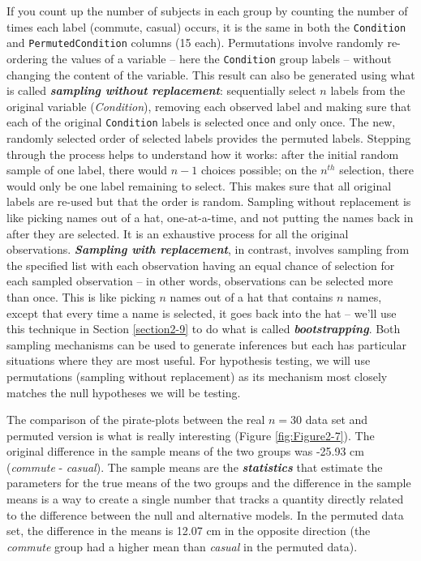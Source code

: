 \documentclass[
]{book}
\begin{document}
If you count up the number of subjects in each group by counting the number
of times each label (commute, casual) occurs, it is the same in both the
\texttt{Condition} and \texttt{PermutedCondition} columns (15 each). Permutations involve randomly
re-ordering the values of a variable -- here the \texttt{Condition} group labels -- without
changing the content of the variable.
This result can also be generated using
what is called \textbf{\emph{sampling without replacement}}:  sequentially select \(n\) labels
from the original variable (\emph{Condition}), removing each observed label and making sure that each of the
original \texttt{Condition} labels is selected once and only once. The new, randomly
selected order of selected labels provides the permuted labels. Stepping
through the process helps to understand how it works: after the initial random
sample of one label, there would \(n - 1\) choices possible; on the \(n^{th}\)
selection, there would only be one label remaining to select. This makes sure
that all original labels are re-used but that the order is random. Sampling
without replacement is like picking names out of a hat, one-at-a-time, and not
putting the names back in after they are selected. It is an exhaustive process
for all the original observations. \textbf{\emph{Sampling with replacement}},  in contrast,
involves sampling from the specified list with each observation having an equal
chance of selection for each sampled observation -- in other words, observations
can be selected more than once. This is like picking \(n\) names out of a hat that
contains \(n\) names, except that every time a name is selected, it goes back into
the hat -- we'll use this technique in Section \ref{section2-9}
to do what is called \textbf{\emph{bootstrapping}}.
Both sampling mechanisms can be
used to generate inferences but each has particular situations
where they are most useful. For hypothesis testing,
we will use permutations 
(sampling without replacement) as its mechanism most closely matches the null hypotheses we will be testing.

\indent The comparison of the pirate-plots  between the real \(n = 30\) data set and permuted version is what is really interesting (Figure \ref{fig:Figure2-7}). The
original difference in the sample means of the two groups was -25.93 cm (\emph{commute} - \emph{casual}). The sample means are the \textbf{\emph{statistics}}
that estimate the parameters for the true means of the two groups and the difference in the sample means is a way to create a single number that tracks a quantity directly related to the difference between the null and alternative models. In the
permuted data set, the difference in the means is 12.07 cm in the opposite
direction (the \emph{commute} group had a higher mean than \emph{casual} in the permuted data).
\end{document}
